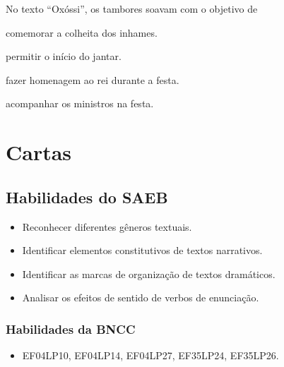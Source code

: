 No texto ``Oxóssi'', os tambores soavam com o objetivo de

\begin{escolha}
\item comemorar a colheita dos inhames.

\item permitir o início do jantar.

\item fazer homenagem ao rei durante a festa.

\item acompanhar os ministros na festa.
\end{escolha}

\chapter{Cartas}


\section{Habilidades do SAEB}

\begin{itemize}
\item Reconhecer diferentes gêneros textuais.

\item Identificar elementos constitutivos de textos narrativos.

\item Identificar as marcas de organização de textos dramáticos.

\item Analisar os efeitos de sentido de verbos de enunciação.
\end{itemize}


\subsection{Habilidades da BNCC}

\begin{itemize}
	\item
EF04LP10, EF04LP14, EF04LP27, EF35LP24, EF35LP26.
\end{itemize}

